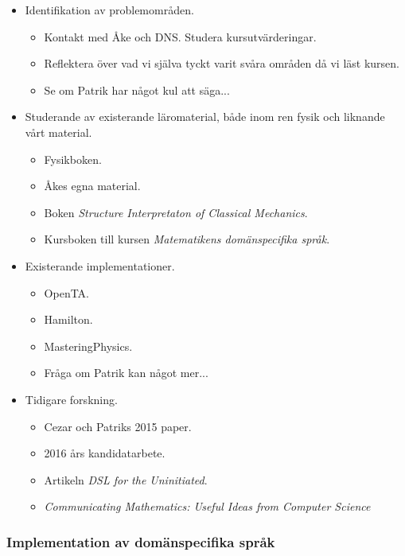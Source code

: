 \documentclass[12pt,a4paper]{article}
\begin{document}
\begin{itemize}
    \item Identifikation av problemområden.
        \begin{itemize}
            \item Kontakt med Åke och DNS. Studera kursutvärderingar.
            \item Reflektera över vad vi själva tyckt varit svåra områden då vi läst kursen.
            \item Se om Patrik har något kul att säga...
        \end{itemize}
    \item Studerande av existerande läromaterial, både inom ren fysik och liknande vårt material.
        \begin{itemize}
            \item Fysikboken.
            \item Åkes egna material.
            \item Boken \textit{Structure Interpretaton of Classical Mechanics}\cite{SICM}.
            \item Kursboken till kursen \textit{Matematikens domänspecifika språk}.
        \end{itemize}
    \item Existerande implementationer.
        \begin{itemize}
            \item OpenTA.
            \item Hamilton.
            \item MasteringPhysics.
            \item Fråga om Patrik kan något mer...
        \end{itemize}
    \item Tidigare forskning.
        \begin{itemize}
            \item Cezar och Patriks 2015 paper.
            \item 2016 års kandidatarbete.
            \item Artikeln \textit{DSL for the Uninitiated}.
            \item \textit{Communicating Mathematics: Useful Ideas from Computer Science}
        \end{itemize}
\end{itemize}

\subsubsection*{Implementation av domänspecifika språk}
\end{document}
